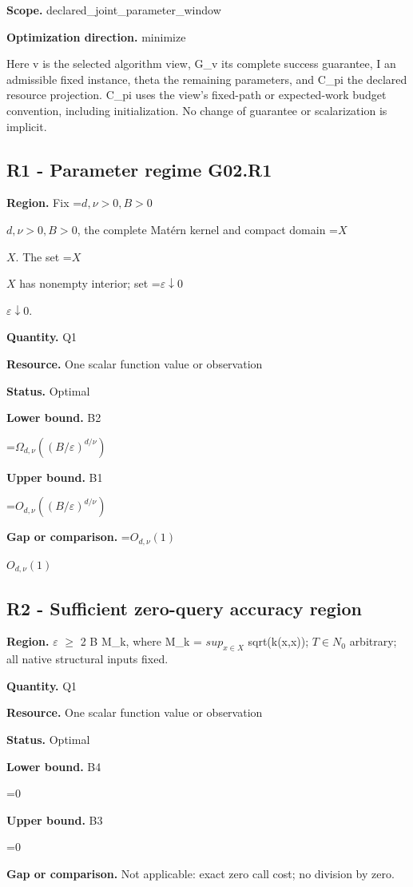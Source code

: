 \documentclass[10pt,a4paper]{article}
\newcommand{\AtlasMath}[1]{\par\begingroup\centering\setbox0=\hbox{$\displaystyle #1$}\ifdim\wd0>1.4\linewidth\typeout{ATLAS WIDE FORMULA: \the\wd0}\fi\ifdim\wd0>\linewidth\resizebox{\linewidth}{!}{\box0}\else\box0\fi\par\endgroup}
\newcommand{\AtlasInlineMath}[1]{\begingroup\setbox0=\hbox{$#1$}\ifdim\wd0>.4\linewidth\endgroup\AtlasMath{#1}\else\endgroup$#1$\fi}
\begin{document}
\textbf{Scope.} declared\_\allowbreak{}joint\_\allowbreak{}parameter\_\allowbreak{}window

\textbf{Optimization direction.} minimize

Here v is the selected algorithm view, G\_\allowbreak{}v its complete success guarantee, I an admissible fixed instance, theta the remaining parameters, and C\_\allowbreak{}pi the declared resource projection. C\_\allowbreak{}pi uses the view's fixed-path or expected-work budget convention, including initialization. No change of guarantee or scalarization is implicit.

\subsection{R1 - Parameter regime G02.R1}
\textbf{Region.} Fix \AtlasInlineMath{d,\nu>0,B>0}, the complete Matérn kernel and compact domain \AtlasInlineMath{X}. The set \AtlasInlineMath{X} has nonempty interior; set \AtlasInlineMath{\varepsilon\downarrow0}.

\textbf{Quantity.} Q1

\textbf{Resource.} One scalar function value or observation

\textbf{Status.} Optimal

\textbf{Lower bound.} B2

\AtlasMath{\Omega_{d,\nu}((B/\varepsilon)^{d/\nu})}
\textbf{Upper bound.} B1

\AtlasMath{O_{d,\nu}((B/\varepsilon)^{d/\nu})}
\textbf{Gap or comparison.} \AtlasInlineMath{O_{d,\nu}(1)}

\subsection{R2 - Sufficient zero-query accuracy region}
\textbf{Region.} $\varepsilon$ $\ge$ 2 B M\_\allowbreak{}k, where M\_\allowbreak{}k = $sup_{x\in X}$ sqrt(k(x,x)); $T\in N_0$ arbitrary; all native structural inputs fixed.

\textbf{Quantity.} Q1

\textbf{Resource.} One scalar function value or observation

\textbf{Status.} Optimal

\textbf{Lower bound.} B4

\AtlasMath{0}
\textbf{Upper bound.} B3

\AtlasMath{0}
\textbf{Gap or comparison.} Not applicable: exact zero call cost; no division by zero.
\end{document}
